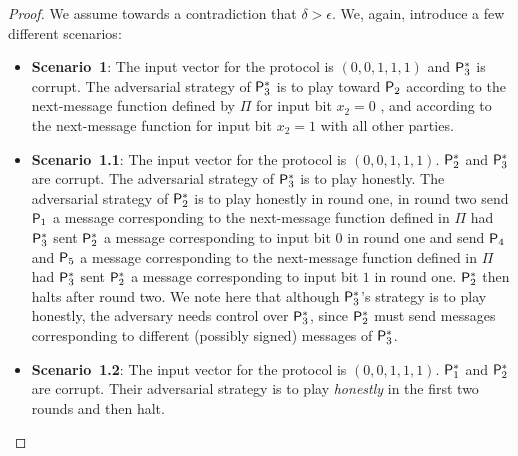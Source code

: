 \begin{proof}
We assume towards a contradiction that $\delta > \epsilon$. We, again, introduce a few different scenarios:
\begin{itemize}
    \item\textbf{Scenario~1}:
    The input vector for the protocol is $(0,0,1,1,1)$ and $\mathsf{P}_3^\ast$ is corrupt. The adversarial strategy of  $\mathsf{P}_3^\ast$ is to play toward $\mathsf{P}_2$ according to the next-message function defined by $\Pi$ for input bit $x_2=0$ , and according to the next-message function for input bit $x_2=1$ with all other parties.
    \item\textbf{Scenario~1.1}:
    The input vector for the protocol is $(0,0,1,1,1)$.  $\mathsf{P}_2^\ast$ and $\mathsf{P}_3^\ast$ are corrupt. The adversarial strategy of $\mathsf{P}_3^\ast$ is to play honestly. The adversarial strategy of $\mathsf{P}_2^\ast$ is to play honestly in round one, in round two send $\mathsf{P}_1$ a message corresponding to the next-message function defined in $\Pi$ had $\mathsf{P}_3^\ast$ sent $\mathsf{P}_2^\ast$ a message corresponding to input bit $0$ in round one and send $\mathsf{P}_4$ and $\mathsf{P}_5$ a message corresponding to the next-message function defined in $\Pi$ had $\mathsf{P}_3^\ast$ sent $\mathsf{P}_2^\ast$ a message corresponding to input bit $1$ in round one. $\mathsf{P}_2^\ast$ then halts after round two. We note here that although $\mathsf{P}_3^\ast$'s strategy  is to play honestly, the adversary needs control over $\mathsf{P}_3^\ast$, since $\mathsf{P}_2^\ast$ must send messages corresponding to different (possibly signed) messages of $\mathsf{P}_3^\ast$.
    \item\textbf{Scenario~1.2}:
    The input vector for the protocol is $(0,0,1,1,1)$.  $\mathsf{P}_1^\ast$ and $\mathsf{P}_2^\ast$ are corrupt. Their adversarial strategy is to play \emph{honestly} in the first two rounds and then halt.
\end{itemize}	

\end{proof}
